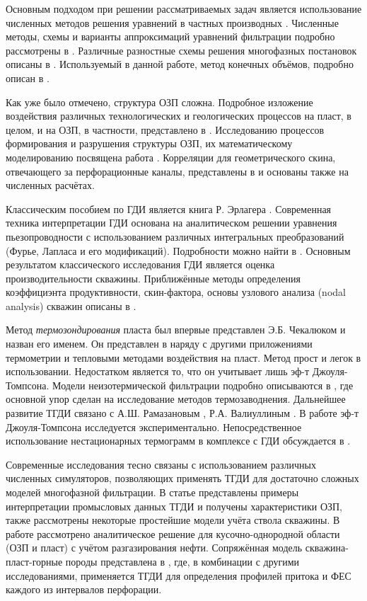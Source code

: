 	Основным подходом при решении рассматриваемых задач является использование численных методов решения уравнений в частных производных \cite{petrov}.
	Численные методы, схемы и варианты аппроксимаций уравнений фильтрации подробно рассмотрены в \cite{kanevskaya, aziz, chen}.
	Различные разностные схемы решения многофазных постановок описаны в \cite{keldysh}.
	Используемый в данной работе, метод конечных объёмов, подробно описан в \cite{leveque}.
	
	Как уже было отмечено, структура ОЗП сложна. Подробное изложение воздействия различных технологических и геологических процессов на пласт, в целом, и на ОЗП, в частности, представлено в \cite{civan}.
	Исследованию процессов формирования и разрушения структуры ОЗП, их математическому моделированию посвящена работа \cite{makarova}.
	Корреляции для геометрического скина, отвечающего за перфорационные каналы, представлены в \cite{tariq} и основаны также на численных расчётах.
	
	Классическим пособием по ГДИ является книга Р. Эрлагера \cite{erlauger}.
	Современная техника интерпретации ГДИ основана на аналитическом решении уравнения пьезопроводности с использованием различных интегральных преобразований (Фурье, Лапласа и его модификаций). Подробности можно найти в \cite{kappa}.
	Основным результатом классического исследования ГДИ является оценка производительности скважины. Приближённые методы определения коэффициэнта продуктивности, скин-фактора, основы узлового анализа (nodal analysis) скважин описаны в \cite{mukerdzhi}.
	

	Метод \textit{термозондирования} пласта был впервые представлен Э.Б. Чекалюком и назван его именем.
	Он представлен в \cite{checkalyuk} наряду с другими приложениями термометрии и тепловыми методами воздействия на пласт.
	Метод прост и легок в использовании. Недостатком является то, что он учитывает лишь эф-т Джоуля-Томпсона.
	Модели неизотермической фильтрации подробно описываются в \cite{alishaev}, где основной упор сделан на исследование методов термозаводнения.
	Дальнейшее развитие ТГДИ связано с А.Ш. Рамазановым \cite{ramazanov_diss}, Р.А. Валиуллиным \cite{valiullin}.
	В работе \cite{ramazanov_old1} эф-т Джоуля-Томпсона исследуется экспериментально.
	Непосредственное использование нестационарных термограмм в комплексе с ГДИ обсуждается в \cite{ramazanov_old2}.
	
	Современные исследования тесно связаны с использованием различных численных симуляторов, позволяющих применять ТГДИ для достаточно сложных моделей многофазной фильтрации. В статье \cite{ramazanov_spe} представлены примеры интерпретации промысловых данных ТГДИ и получены характеристики ОЗП, также рассмотрены некоторые простейшие модели учёта ствола скважины. 
	В работе \cite{ramazanov_main} рассмотрено аналитическое решение для кусочно-однородной области (ОЗП и пласт) с учётом разгазирования нефти.
	Сопряжённая модель скважина-пласт-горные породы представлена в \cite{ramazanov_spe1}, где, в комбинации с другими исследованиями, применяется ТГДИ для определения профилей притока и ФЕС каждого из интервалов перфорации.
	
